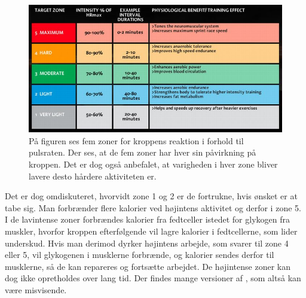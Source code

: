 \begin{figure}[H]
	\centering
	\includegraphics[scale=0.75]{figures/aProblemanalyse/heart-rate-zones.jpg}
	\caption{På figuren ses fem zoner for kroppens reaktion i forhold til pulsraten. Der ses, at de fem zoner har hver sin påvirkning på kroppen. Det er dog også anbefalet, at varigheden i hver zone bliver lavere desto hårdere aktiviteten er.\citep{Heartratejournal2015}}
	\label{fig:PA_Procentpuls}
\end{figure}
Det er dog omdiskuteret, hvorvidt zone 1 og 2 er de fortrukne, hvis ønsket er at tabe sig. Man forbrænder flere kalorier ved højintens aktivitet og derfor i zone 5. I de lavintense zoner forbrændes kalorier fra fedtceller istedet for glykogen fra muskler, hvorfor kroppen efterfølgende vil lagre kalorier i fedtcellerne, som lider underskud. Hvis man derimod dyrker højintens arbejde, som svarer til zone 4 eller 5, vil glykogenen i musklerne forbrænde, og kalorier sendes derfor til musklerne, så de kan repareres og fortsætte arbejdet. De højintense zoner kan dog ikke opretholdes over lang tid. Der findes mange versioner af , som altså kan være misvisende.\citep{Martini2012,Leyland2007,Heartratejournal2015} 
%
%
